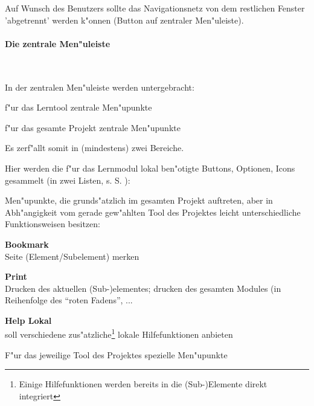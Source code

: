 Auf Wunsch des Benutzers sollte das Navigationsnetz von dem restlichen
Fenster 'abgetrennt' werden k"onnen (Button auf zentraler
Men"uleiste).

\paragraph{Die zentrale Men"uleiste}\label{zentrale_menuleiste}

\mbox{ }
\vspace{0mm}

In der zentralen Men"uleiste werden untergebracht:

\begin{list_sabina}
        \item f"ur das Lerntool zentrale Men"upunkte
        \item f"ur das gesamte Projekt zentrale Men"upunkte
\end{list_sabina}

Es zerf"allt somit in (mindestens) zwei Bereiche.


Hier werden die f"ur das Lernmodul lokal ben"otigte Buttons, Optionen,
Icons gesammelt (in zwei Listen, s. S. \pageref{drei_bereiche_menuleiste}):

Men"upunkte, die grunds"atzlich im gesamten Projekt auftreten, aber in
Abh"angigkeit vom gerade gew"ahlten Tool des Projektes leicht
unterschiedliche Funktionsweisen besitzen:
        
\begin{list_sabina}
        \item \textbf{Bookmark}\\
        Seite (Element/Subelement) merken
        \item \textbf{Print}\\
	Drucken des aktuellen (Sub-)elementes;
	drucken des gesamten Modules (in Reihenfolge des 
	``roten Fadens'', ...
        \item \textbf{Help Lokal}\\
        soll verschiedene zus"atzliche\footnote{Einige Hilfefunktionen
	werden bereits in die (Sub-)Elemente direkt integriert} 
	lokale Hilfefunktionen anbieten
\end{list_sabina}

F"ur das jeweilige Tool des Projektes spezielle Men"upunkte

